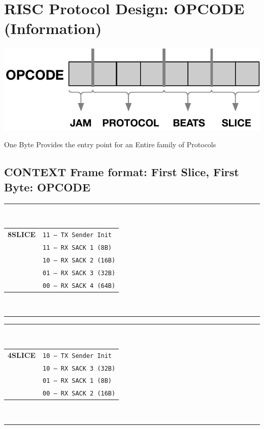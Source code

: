 \documentclass[../../../OAE-SPEC-MAIN.tex]{subfiles}
\begin{document}
\newpage
\section{RISC Protocol Design: OPCODE (Information)}\label{sec:opcode-information}

\begin{marginfigure}
 \centering
  \includegraphics[width=1.1\linewidth]{./figures/opcode.pdf}
\caption{\centering One Byte Provides the entry point for  an Entire family of  Protocols}
\end{marginfigure}

\subsection{CONTEXT Frame format: First Slice, First Byte: OPCODE}

\begin{margintable}
  \footnotesize
  \rule{5.4cm}{0.8pt}\\
  \begin{tabular}{@{}cl@{}}
    \textbf{8SLICE} & \texttt{11 — TX Sender Init} \\
                   & \texttt{11 — RX SACK 1 (8B)} \\
                   & \texttt{10 — RX SACK 2 (16B)} \\
                   & \texttt{01 — RX SACK 3 (32B)} \\
                   & \texttt{00 — RX SACK 4 (64B)} \\
  \end{tabular}\\
  \rule{5.4cm}{0.6pt}
\end{margintable}

\begin{margintable}
  \footnotesize
  \rule{5.4cm}{0.8pt}\\
  \begin{tabular}{@{}cl@{}}
    \textbf{4SLICE} & \texttt{10 — TX Sender Init} \\
                      & \texttt{10 — RX SACK 3 (32B)} \\
                   & \texttt{01 — RX SACK 1 (8B)} \\
                   & \texttt{00 — RX SACK 2 (16B)} \\
  \end{tabular}\\
  \rule{5.4cm}{0.6pt}
\end{margintable}
\end{document}
